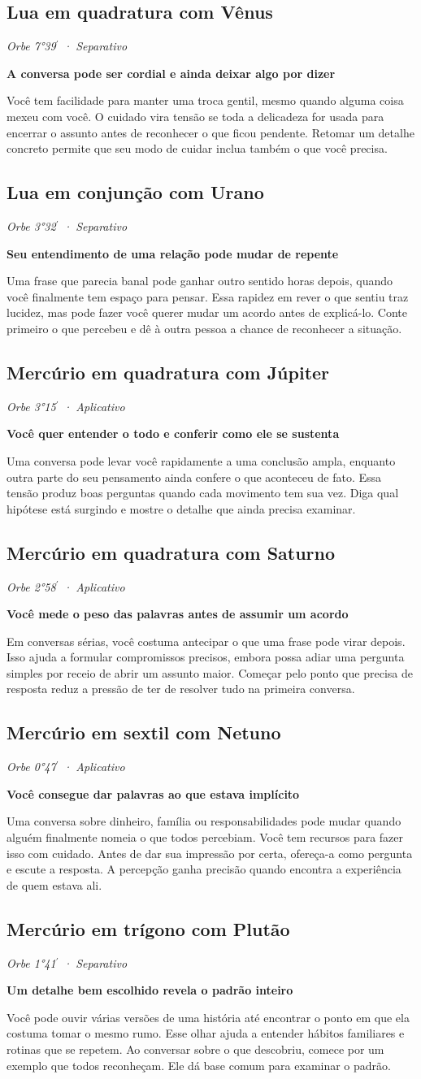 \documentclass[11pt,a4paper]{article}
\newcommand{\leitura}[3]{\subsection{#1}\textit{#2}\par #3}
\newcommand{\subtituloleitura}[1]{\textbf{#1}\par\nopagebreak[4]}
\begin{document}
\leitura{Lua em quadratura com Vênus}{Orbe 7°39\ensuremath{^{\prime}} · Separativo}{
\subtituloleitura{A conversa pode ser cordial e ainda deixar algo por dizer}
Você tem facilidade para manter uma troca gentil, mesmo quando alguma coisa mexeu com você. O cuidado vira tensão se toda a delicadeza for usada para encerrar o assunto antes de reconhecer o que ficou pendente. Retomar um detalhe concreto permite que seu modo de cuidar inclua também o que você precisa.
}

\leitura{Lua em conjunção com Urano}{Orbe 3°32\ensuremath{^{\prime}} · Separativo}{
\subtituloleitura{Seu entendimento de uma relação pode mudar de repente}
Uma frase que parecia banal pode ganhar outro sentido horas depois, quando você finalmente tem espaço para pensar. Essa rapidez em rever o que sentiu traz lucidez, mas pode fazer você querer mudar um acordo antes de explicá-lo. Conte primeiro o que percebeu e dê à outra pessoa a chance de reconhecer a situação.
}

\leitura{Mercúrio em quadratura com Júpiter}{Orbe 3°15\ensuremath{^{\prime}} · Aplicativo}{
\subtituloleitura{Você quer entender o todo e conferir como ele se sustenta}
Uma conversa pode levar você rapidamente a uma conclusão ampla, enquanto outra parte do seu pensamento ainda confere o que aconteceu de fato. Essa tensão produz boas perguntas quando cada movimento tem sua vez. Diga qual hipótese está surgindo e mostre o detalhe que ainda precisa examinar.
}

\leitura{Mercúrio em quadratura com Saturno}{Orbe 2°58\ensuremath{^{\prime}} · Aplicativo}{
\subtituloleitura{Você mede o peso das palavras antes de assumir um acordo}
Em conversas sérias, você costuma antecipar o que uma frase pode virar depois. Isso ajuda a formular compromissos precisos, embora possa adiar uma pergunta simples por receio de abrir um assunto maior. Começar pelo ponto que precisa de resposta reduz a pressão de ter de resolver tudo na primeira conversa.
}

\leitura{Mercúrio em sextil com Netuno}{Orbe 0°47\ensuremath{^{\prime}} · Aplicativo}{
\subtituloleitura{Você consegue dar palavras ao que estava implícito}
Uma conversa sobre dinheiro, família ou responsabilidades pode mudar quando alguém finalmente nomeia o que todos percebiam. Você tem recursos para fazer isso com cuidado. Antes de dar sua impressão por certa, ofereça-a como pergunta e escute a resposta. A percepção ganha precisão quando encontra a experiência de quem estava ali.
}

\leitura{Mercúrio em trígono com Plutão}{Orbe 1°41\ensuremath{^{\prime}} · Separativo}{
\subtituloleitura{Um detalhe bem escolhido revela o padrão inteiro}
Você pode ouvir várias versões de uma história até encontrar o ponto em que ela costuma tomar o mesmo rumo. Esse olhar ajuda a entender hábitos familiares e rotinas que se repetem. Ao conversar sobre o que descobriu, comece por um exemplo que todos reconheçam. Ele dá base comum para examinar o padrão.
}
\end{document}
